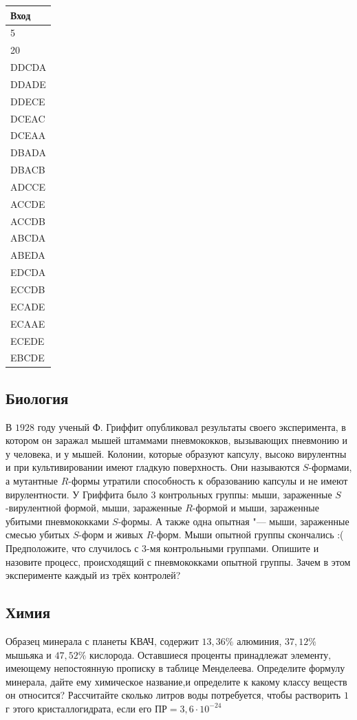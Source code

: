 \documentclass[a4paper, 12pt]{article}
\begin{document}
 \begin{tabular}{|l|}
 	\hline
 	Вход \\
 	\hline
 	5 \\
 	20 \\
 	DDCDA\\ 
 	DDADE \\
 	DDECE \\
 	DCEAC \\
 	DCEAA \\
 	DBADA \\
 	DBACB \\
 	ADCCE \\
 	ACCDE \\
 	ACCDB \\
 	ABCDA \\
 	ABEDA \\
 	EDCDA \\
 	ECCDB \\
 	ECADE \\
 	ECAAE \\
 	ECEDE \\
 	EBCDE
 	\\
 	\hline
 \end{tabular}
 \subsection*{Биология} 
 В $1928$ году ученый Ф. Гриффит опубликовал результаты своего эксперимента, в котором он заражал мышей штаммами пневмококков, вызывающих пневмонию и у человека, и у мышей. Колонии, которые образуют капсулу, высоко вирулентны и при культивировании имеют гладкую поверхность. Они называются $S$-формами, а мутантные $R$-формы утратили способность к образованию капсулы и не имеют вирулентности. У Гриффита было $3$ контрольных группы: мыши, зараженные $S$-вирулентной формой, мыши, зараженные $R$-формой и мыши, зараженные убитыми пневмококками $S$-формы. А также одна опытная "--- мыши, зараженные смесью убитых $S$-форм и живых $R$-форм. Мыши опытной группы скончались :( Предположите, что случилось с $3$-мя контрольными группами. Опишите и назовите процесс, происходящий с пневмококками опытной группы. Зачем в этом эксперименте каждый из трёх контролей?
 \subsection*{Химия}
 Образец минерала с планеты КВАЧ, содержит $13,36\%$ алюминия, $37,12\%$ мышьяка и $47,52\%$ кислорода. Оставшиеся проценты принадлежат элементу, имеющему непостоянную  прописку  в таблице Менделеева. Определите формулу минерала, дайте ему химическое название,и определите к какому классу веществ он относится?
 Рассчитайте сколько литров воды потребуется, чтобы растворить $1$г этого кристаллогидрата, если его ПР$=3,6\cdot10^{-24}$
\end{document}
